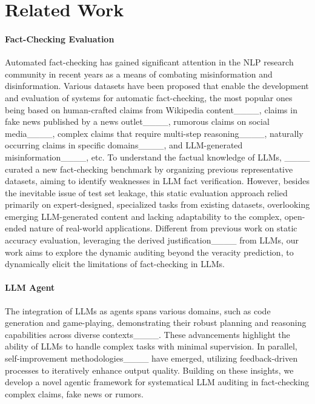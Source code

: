 \section{Related Work}
\vspace{-3pt}
\paragraph{Fact-Checking Evaluation} 
Automated fact-checking has gained significant attention in the NLP research community in recent years as a means of combating misinformation and disinformation. Various datasets have been proposed that enable the development and evaluation of systems for automatic fact-checking, the most popular ones being based on human-crafted claims from Wikipedia content____, claims in fake news published by a news outlet____, rumorous claims on social media____, complex claims that require multi-step reasoning____, naturally occurring claims in specific domains____, and LLM-generated misinformation____, etc. To understand the factual knowledge of LLMs, ____ curated a new fact-checking benchmark by organizing previous representative datasets, aiming to identify weaknesses in LLM fact verification. However, besides the inevitable issue of test set leakage, this static evaluation approach relied primarily on expert-designed, specialized tasks from existing datasets, overlooking emerging LLM-generated content and lacking adaptability to the complex, open-ended nature of real-world applications. Different from previous work on static accuracy evaluation, leveraging the derived justification____ from LLMs, our work aims to explore the dynamic auditing beyond the veracity prediction, to dynamically elicit the limitations of fact-checking in LLMs.

\vspace{-3pt}
\paragraph{LLM Agent} 
The integration of LLMs as agents spans various domains, such as code generation and game-playing, demonstrating their robust planning and reasoning capabilities across diverse contexts____. These advancements highlight the ability of LLMs to handle complex tasks with minimal supervision. In parallel, self-improvement methodologies____ have emerged, utilizing feedback-driven processes to iteratively enhance output quality. Building on these insights, we develop a novel agentic framework for systematical LLM auditing in fact-checking complex claims, fake news or rumors.